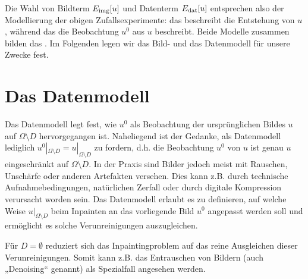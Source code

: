 \documentclass{mythesis}
\begin{document}
Die Wahl von Bildterm $E_{\mathrm{img}}[u]$ und Datenterm $E_{\mathrm{dat}}[u]$ entsprechen also der Modellierung der obigen Zufallsexperimente:
das  beschreibt die Entstehung von $u$, während das  die Beobachtung $u^0$ aus $u$ beschreibt.
Beide Modelle zusammen bilden das .
Im Folgenden legen wir das Bild- und das Datenmodell für unsere Zwecke fest.



%
%
%

\section{Das Datenmodell}

Das Datenmodell legt fest, wie $u^0$ als Beobachtung der ursprünglichen Bildes $u$ auf $\Omega \setminus D$ hervorgegangen ist.
Naheliegend ist der Gedanke, als Datenmodell lediglich $u^0|_{\Omega \setminus D} = u|_{\Omega \setminus D}$ zu fordern, d.h. die Beobachtung $u^0$ von $u$ ist genau $u$ eingeschränkt auf $\Omega \setminus D$.
In der Praxis sind Bilder jedoch meist mit Rauschen, Unschärfe oder anderen Artefakten versehen.
Dies kann z.B. durch technische Aufnahmebedingungen, natürlichen Zerfall oder durch digitale Kompression verursacht worden sein.
Das Datenmodell erlaubt es zu definieren, auf welche Weise $u|_{\Omega \setminus D}$ beim Inpainten an das vorliegende Bild $u^0$ angepasst werden soll und ermöglicht es solche Verunreinigungen auszugleichen.

Für $D = \emptyset$ reduziert sich das Inpaintingproblem auf das reine Ausgleichen dieser Verunreinigungen.
Somit kann z.B. das Entrauschen von Bildern (auch „Denoising“ genannt) als Spezialfall angesehen werden.
\end{document}
